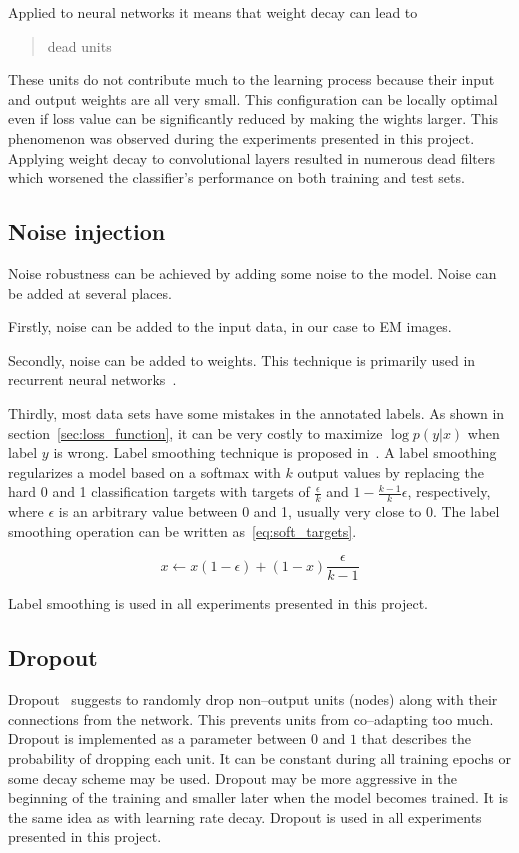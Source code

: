 \documentclass[a4paper, 11pt, table]{article}
\begin{document}
Applied to neural networks it means that weight decay can lead to \blockquote{dead units}. These units do not contribute much to the learning process because their input and output weights are all very small. This configuration can be locally optimal even if loss value can be significantly reduced by making the wights larger. This phenomenon was observed during the experiments presented in this project. Applying weight decay to convolutional layers resulted in numerous dead filters which worsened the classifier's performance on both training and test sets.

\subsection{Noise injection}
Noise robustness can be achieved by adding some noise to the model. Noise can be added at several places. 

Firstly, noise can be added to the input data, in our case to EM images. 

Secondly, noise can be added to weights. This technique is primarily used in recurrent neural networks~\cite{pmid18263536}. 

Thirdly, most data sets have some mistakes in the annotated labels. As shown in section~\ref{sec:loss_function}, it can be very costly to maximize $\log p(y|x)$ when label $y$ is wrong. Label smoothing technique is proposed in~\cite{dl_book}. A label smoothing regularizes a model based on a softmax with $k$ output values by replacing the hard 0 and 1 classification targets with targets of $\frac{\epsilon}{k}$ and $1 - \frac{k-1}{k}\epsilon$, respectively, where $\epsilon$ is an arbitrary value between 0 and 1, usually very close to 0. The label smoothing operation can be written as~\ref{eq:soft_targets}.

\begin{equation}
\label{eq:soft_targets}
x \leftarrow x \left( 1 - \epsilon \right) + \left(1 - x\right) \frac{\epsilon}{k - 1}
\end{equation}

Label smoothing is used in all experiments presented in this project.

\subsection{Dropout}
\label{sec:dropout}
Dropout~\cite{JMLR:v15:srivastava14a} suggests to randomly drop non--output units (nodes) along with their connections from the network. This prevents units from co--adapting too much. Dropout is implemented as a parameter between $0$ and $1$ that describes the probability of dropping each unit. It can be constant during all training epochs or some decay scheme may be used. Dropout may be more aggressive in the beginning of the training and smaller later when the model becomes trained. It is the same idea as with learning rate decay. Dropout is used in all experiments presented in this project.
\end{document}
